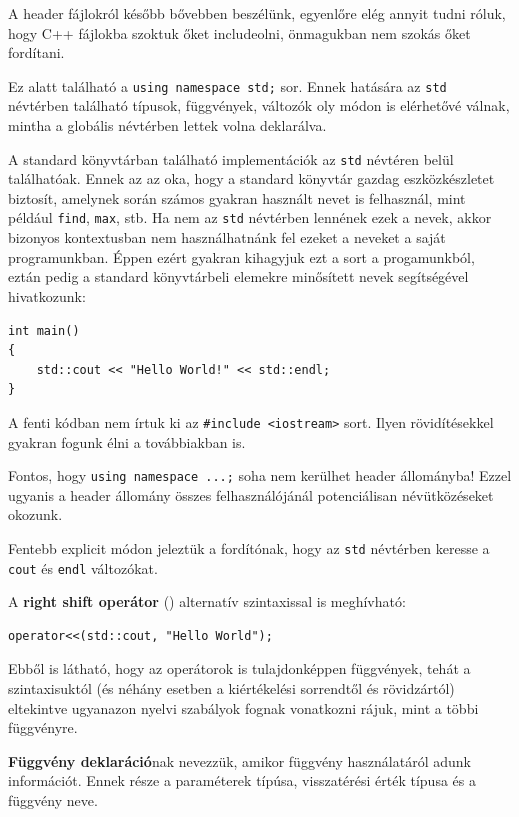 \documentclass[a4paper,11.5pt,table]{article}
\begin{document}
	A header fájlokról később bővebben beszélünk, egyenlőre elég annyit tudni róluk, hogy C++ fájlokba szoktuk őket includeolni, önmagukban nem szokás őket fordítani.
	
	\medskip
	Ez alatt található a \texttt{using namespace std;} sor. Ennek hatására az \texttt{std} névtérben található típusok, függvények, változók oly módon is elérhetővé válnak, mintha a globális névtérben lettek volna deklarálva. 
	
	A standard könyvtárban található implementációk az \texttt{std} névtéren belül találhatóak. Ennek az az oka, hogy a standard könyvtár gazdag eszközkészletet biztosít, amelynek során számos gyakran használt nevet is felhasznál, mint például \texttt{find}, \texttt{max}, stb. Ha nem az \texttt{std} névtérben lennének ezek a nevek, akkor bizonyos kontextusban nem használhatnánk fel ezeket a neveket a saját programunkban. Éppen ezért gyakran kihagyjuk ezt a sort a progamunkból, eztán pedig a standard könyvtárbeli elemekre minősített nevek segítségével hivatkozunk:
	\begin{lstlisting}
int main()
{
	std::cout << "Hello World!" << std::endl;
}
	\end{lstlisting}
	\begin{note}
		A fenti kódban nem írtuk ki az \texttt{\#include <iostream>} sort. Ilyen rövidítésekkel gyakran fogunk élni a továbbiakban is. 
	\end{note}

	Fontos, hogy \texttt{using namespace ...;} soha nem kerülhet header állományba! Ezzel ugyanis a header állomány összes felhasználójánál potenciálisan névütközéseket okozunk.

	Fentebb explicit módon jeleztük a fordítónak, hogy az \texttt{std} névtérben keresse a \texttt{cout} és \texttt{endl} változókat.
	
	\medskip
	A \textbf{right shift operátor} (\texttt{\<}) alternatív szintaxissal is meghívható:
	\begin{lstlisting}
operator<<(std::cout, "Hello World");
	\end{lstlisting}
	Ebből is látható, hogy az operátorok is tulajdonképpen függvények, tehát a szintaxisuktól (és néhány esetben a kiértékelési sorrendtől és rövidzártól) eltekintve ugyanazon nyelvi szabályok fognak vonatkozni rájuk, mint a többi függvényre.
	
	\medskip
	\textbf{Függvény deklaráció}nak nevezzük, amikor függvény használatáról adunk információt. Ennek része a paraméterek típúsa, visszatérési érték típusa és a függvény neve.
	
\end{document}
